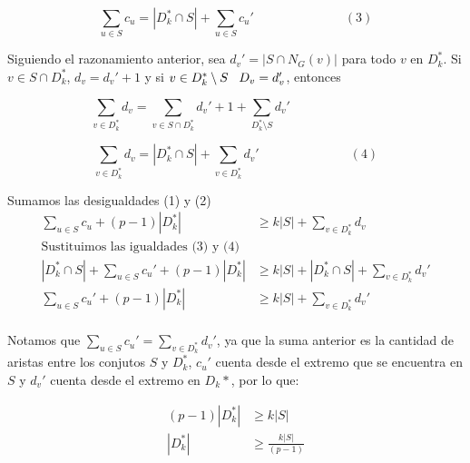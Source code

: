 \documentclass{article}
\begin{document}
$$\sum_{u\in S}c_u=|D_{k}^*\cap S| + \sum_{u\in S}c_{u}' \hspace{3cm} (3)$$

Siguiendo el razonamiento anterior, sea $d_{v}'=|S\cap N_{G}(v)|$ para todo $v$ en $D_{k}^*$. Si $v\in S\cap D_{k}^*$, $d_v=d_{v}'+1$ y si $v\in D_{k}^*\setminus S \hspace{.3cm} D_v=d_{v}'$, entonces 

$$\sum_{v\in D_{k}^*}d_v = \sum_{v\in S\cap D_{k}^*} d_v' + 1 + \sum_{D_k^*\setminus S} d_v' \hspace{3cm}$$

$$\sum_{v\in D_{k}^*}d_v=|D_{k}^*\cap S|+\sum_{v\in D_{k}^*}d_v' \hspace{3cm} (4)$$

Sumamos las desigualdades (1) y (2)\\
\begin{align*}
\sum_{u\in S}c_u + (p-1)|D_{k}^*| &\geq k|S|+\sum_{v\in D_{k}^*}d_v\\
\text{Sustituimos las igualdades (3) y (4)}\\
|D_{k}^*\cap S| + \sum_{u\in S}c_{u}'+(p-1)|D_{k}^*| &\geq k|S|+|D_{k}^*\cap S|+\sum_{v\in D_{k}^*}d_v'\\
\sum_{u\in S}c_{u}'+(p-1)|D_{k}^*| &\geq k|S|+\sum_{v\in D_{k}^*}d_v'\\
\end{align*}

Notamos que $\sum_{u\in S}c_{u}' = \sum_{v\in D_{k}^*}d_v'$, ya que la suma anterior es la cantidad de aristas entre los conjutos $S$ y $D_k^*$, $c_u'$ cuenta desde el extremo que se encuentra en $S$ y $d_v'$ cuenta desde el extremo en $D_k*$, por lo que:\\

\begin{align*}
(p-1)|D_{k}^*| &\geq k|S|\\
|D_{k}^*|&\geq \frac{k|S|}{(p-1)}\\
\end{align*}
\end{document}
